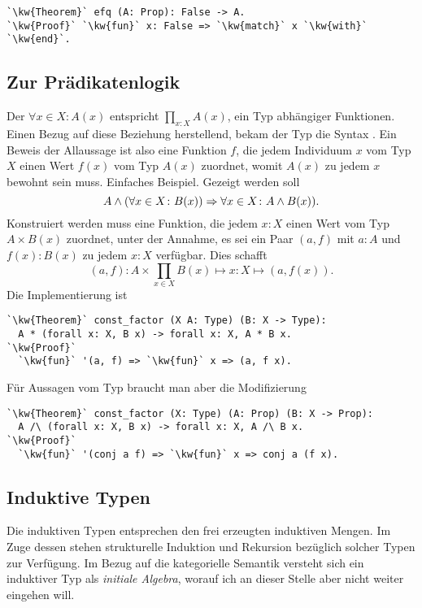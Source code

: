 \begin{lstlisting}[escapechar=`, xleftmargin=\mathindent]
`\kw{Theorem}` efq (A: Prop): False -> A.
`\kw{Proof}` `\kw{fun}` x: False => `\kw{match}` x `\kw{with}` `\kw{end}`.
\end{lstlisting}

\subsection{Zur Prädikatenlogik}

Der  $\forall x\in X\colon A(x)$ entspricht
$\prod_{x\colon X} A(x)$, ein Typ abhängiger Funktionen. Einen Bezug auf
diese Beziehung herstellend, bekam der Typ die Syntax
. Ein Beweis der Allaussage ist also eine
Funktion $f$, die jedem Individuum $x$ vom Typ $X$ einen Wert $f(x)$ vom
Typ $A(x)$ zuordnet, womit $A(x)$ zu jedem $x$ bewohnt sein muss.
Einfaches Beispiel. Gezeigt werden soll
\[A\land (\forall x\in X\colon B(x))\Rightarrow\forall x\in X\colon A\land B(x)).\]
Konstruiert werden muss eine Funktion, die jedem $x\colon X$ einen
Wert vom Typ $A\times B(x)$ zuordnet, unter der Annahme, es sei ein Paar $(a,f)$
mit $a\colon A$ und $f(x)\colon B(x)$ zu jedem $x\colon X$ verfügbar.
Dies schafft
\[\textstyle (a,f)\colon A\times\prod_{x\in X} B(x)\mapsto
x\colon X\mapsto (a, f(x)).\]
Die Implementierung ist
\begin{lstlisting}[escapechar=`, xleftmargin=\mathindent]
`\kw{Theorem}` const_factor (X A: Type) (B: X -> Type):
  A * (forall x: X, B x) -> forall x: X, A * B x.
`\kw{Proof}`
  `\kw{fun}` '(a, f) => `\kw{fun}` x => (a, f x).
\end{lstlisting}
Für Aussagen vom Typ  braucht man aber die Modifizierung
\begin{lstlisting}[escapechar=`, xleftmargin=\mathindent]
`\kw{Theorem}` const_factor (X: Type) (A: Prop) (B: X -> Prop):
  A /\ (forall x: X, B x) -> forall x: X, A /\ B x.
`\kw{Proof}`
  `\kw{fun}` '(conj a f) => `\kw{fun}` x => conj a (f x).
\end{lstlisting}

\subsection{Induktive Typen}

Die induktiven Typen entsprechen den frei erzeugten induktiven Mengen.
Im Zuge dessen stehen strukturelle Induktion und Rekursion bezüglich
solcher Typen zur Verfügung. Im Bezug auf die kategorielle Semantik
versteht sich ein induktiver Typ als \emph{initiale Algebra}, worauf ich
an dieser Stelle aber nicht weiter eingehen will.

